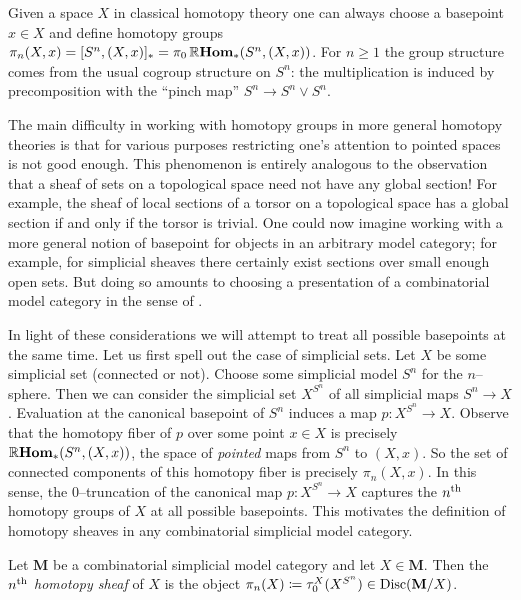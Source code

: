 Given a space \(X\) in classical homotopy theory one can always choose a basepoint \(x\in X\) and define homotopy groups \(\pi_{n}(X,x) = [S^{n}, (X,x)]_{*} = \pi_{0}\operatorname{\mathbb{R}\textnormal{\bfseries Hom}}_{*}(S^{n}, (X,x))\). For \(n\geq 1\) the group structure comes from the usual cogroup structure on \(S^{n}\): the multiplication is induced by precomposition with the \enquote{pinch map} \(S^{n}\to S^{n}\vee S^{n}\).

The main difficulty in working with homotopy groups in more general homotopy theories is that for various purposes restricting one's attention to pointed spaces is not good enough. This phenomenon is entirely analogous to the observation that a sheaf of sets on a topological space need not have any global section! For example, the sheaf of local sections of a torsor on a topological space has a global section if and only if the torsor is trivial. One could now imagine working with a more general notion of basepoint for objects in an arbitrary model category; for example, for simplicial sheaves there certainly exist sections over small enough open sets. But doing so amounts to choosing a presentation of a combinatorial model category in the sense of \cite{mr1870516}.

In light of these considerations we will attempt to treat all possible basepoints at the same time. Let us first spell out the case of simplicial sets. Let \(X\) be some simplicial set (connected or not). Choose some simplicial model \(S^{n}\) for the \(n\)--sphere. Then we can consider the simplicial set \(X^{S^{n}}\) of all simplicial maps \(S^{n}\to X\). Evaluation at the canonical basepoint of \(S^{n}\) induces a map \(p\colon X^{S^{n}}\to X\). Observe that the homotopy fiber of \(p\) over some point \(x\in X\) is precisely \(\operatorname{\mathbb{R}\textnormal{\bfseries Hom}}_{*}(S^{n}, (X,x))\), the space of \emph{pointed} maps from \(S^{n}\) to \((X,x)\). So the set of connected components of this homotopy fiber is precisely \(\pi_{n}(X,x)\). In this sense, the \(0\)--truncation of the canonical map \(p\colon X^{S^{n}}\to X\) captures the \(n\textsuperscript{th}\) homotopy groups of \(X\) at all possible basepoints. This motivates the definition of homotopy sheaves in any combinatorial simplicial model category.

\begin{definition}
  Let \(\mathbf M\) be a combinatorial simplicial model category and let \(X\in\mathbf M\). Then the \emph{\(n\textsuperscript{th}\) homotopy sheaf} of \(X\) is the object \(\pi_{n}(X)\coloneqq\tau_{0}^{X}(X^{S^{n}})\in\operatorname{\textnormal{Disc}}(\mathbf M/X)\).
\end{definition}

